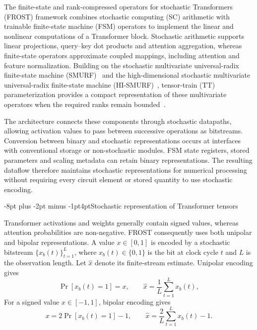 \documentclass[pdflatex,sn-mathphys-num]{sn-jnl}
\makeatletter
\renewcommand\subsection{\@startsection{subsection}{2}{\z@}%
  {-8pt plus -2pt minus -1pt}{4pt}{\subsectionfont}}
\theoremstyle{thmstyleone}
\theoremstyle{thmstyletwo}
\theoremstyle{thmstylethree}
\makeatother
\begin{document}
The finite-state and rank-compressed operators for stochastic Transformers (FROST) framework combines stochastic computing (SC) arithmetic with trainable finite-state machine (FSM) operators to implement the linear and nonlinear computations of a Transformer block. Stochastic arithmetic supports linear projections, query--key dot products and attention aggregation, whereas finite-state operators approximate coupled mappings, including attention and feature normalization. Building on the stochastic multivariate universal-radix finite-state machine (SMURF)~\cite{feng2025smurf} and the high-dimensional stochastic multivariate universal-radix finite-state machine (HI-SMURF)~\cite{feng2026smurf}, tensor-train (TT) parameterization provides a compact representation of these multivariate operators when the required ranks remain bounded~\cite{oseledets2011tensor}.

The architecture connects these components through stochastic datapaths, allowing activation values to pass between successive operations as bitstreams. Conversion between binary and stochastic representations occurs at interfaces with conventional storage or non-stochastic modules. FSM state registers, stored parameters and scaling metadata can retain binary representations. The resulting dataflow therefore maintains stochastic representations for numerical processing without requiring every circuit element or stored quantity to use stochastic encoding.

\subsection{Stochastic representation of Transformer tensors}

Transformer activations and weights generally contain signed values, whereas attention probabilities are non-negative. FROST consequently uses both unipolar and bipolar representations. A value $x\in[0,1]$ is encoded by a stochastic bitstream $\{x_b(t)\}_{t=1}^{L}$, where $x_b(t)\in\{0,1\}$ is the bit at clock cycle $t$ and $L$ is the observation length. Let $\widehat{x}$ denote its finite-stream estimate. Unipolar encoding gives~\cite{gaines1969stochastic,alaghi2013survey}
\begin{equation}
\Pr\!\left[x_b(t)=1\right]=x, \qquad \widehat{x} = \frac{1}{L} \sum_{t=1}^{L}x_b(t), \label{eq:unipolar_representation}
\end{equation}
For a signed value $x\in[-1,1]$, bipolar encoding gives
\begin{equation}
x = 2\Pr\!\left[x_b(t)=1\right]-1, \qquad \widehat{x} = \frac{2}{L} \sum_{t=1}^{L}x_b(t)-1. \label{eq:bipolar_representation}
\end{equation}
\end{document}
